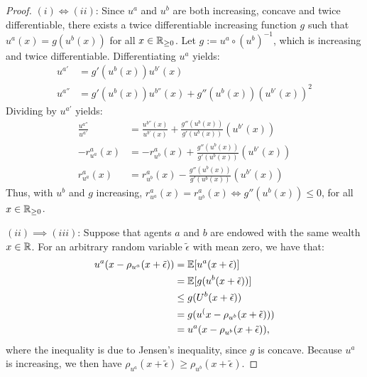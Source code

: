\documentclass[twoside, titlepage]{article}
\begin{document}
\begin{proof}
    $(i) \iff (ii)$: Since $u^a$ and $u^b$ are both increasing, concave and twice differentiable, there exists a twice differentiable increasing function $g$ such that $u^a(x) = g(u^b(x))$ for all $x \in \mathbb{R}_{\geq0}$. Let $g := u^a \circ (u^b)^{-1}$, which is increasing and twice differentiable. Differentiating $u^a$ yields:
    \begin{align*}
        u^{a'} &= g'(u^b(x))u^{b'}(x) \\
        u^{a''} &= g'(u^b(x))u^{b''}(x) + g''(u^b(x))(u^{b'}(x))^2
    \end{align*}
    Dividing by $u^{a'}$ yields:
    \begin{align*}
        \frac{u^{a''}}{u^{a'}} &= \frac{u^{b''}(x)}{u^{b'}(x)} + \frac{g''(u^b(x))}{g'(u^b(x))}(u^{b'}(x)) \\
        -r^a_{u^a}(x) &= -r^a_{u^b}(x) + \frac{g''(u^b(x))}{g'(u^b(x))}(u^{b'}(x)) \\
        r^a_{u^a}(x) &= r^a_{u^b}(x) - \frac{g''(u^b(x))}{g'(u^b(x))}(u^{b'}(x))
    \end{align*}
    Thus, with $u^b$ and $g$ increasing, $r^a_{u^a}(x) = r^a_{u^b}(x) \iff g''(u^b(x)) \leq 0$, for all $x \in \mathbb{R}_{\geq0}$.

    $(ii) \implies (iii)$: Suppose that agents $a$ and $b$ are endowed with the same wealth $x \in \mathbb{R}$. For an arbitrary random variable $\tilde{\epsilon}$ with mean zero, we have that:
    \begin{align*}
        u^a(x -\rho_{u^a}(x + \tilde{\epsilon})) &= \mathbb{E}[u^a(x + \tilde{\epsilon})] \\
        &= \mathbb{E}[g(u^b(x + \tilde{\epsilon}))] \\
        &\leq g(U^b(x + \tilde{\epsilon})) \\
        &= g(u^(x - \rho_{u^b}(x + \tilde{\epsilon}))) \\
        &= u^a(x - \rho_{u^b}(x + \tilde{\epsilon})),
    \end{align*}
    where the inequality is due to Jensen's inequality, since $g$ is concave. Because $u^a$ is increasing, we then have $\rho_{u^a}(x + \tilde{\epsilon}) \geq \rho_{u^b}(x + \tilde{\epsilon})$.


\end{proof}
\end{document}
